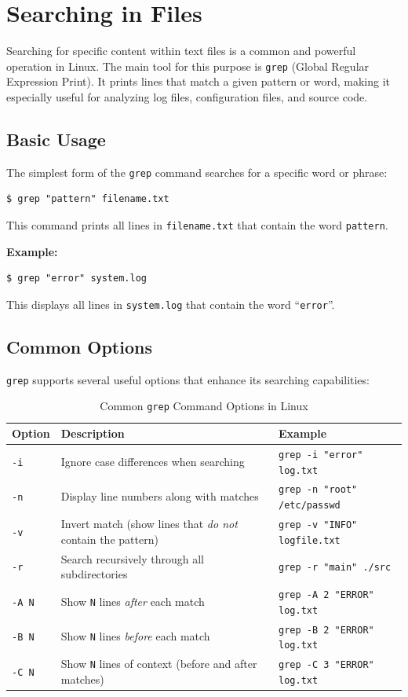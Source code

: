 \section{Searching in Files}
Searching for specific content within text files is a common and powerful operation in Linux. The main tool for this purpose is \texttt{grep} (Global Regular Expression Print). It prints lines that match a given pattern or word, making it especially useful for analyzing log files, configuration files, and source code.

\subsection{Basic Usage}
The simplest form of the \texttt{grep} command searches for a specific word or phrase:
\begin{lstlisting}[language=Terminal]
$ grep "pattern" filename.txt
\end{lstlisting}
This command prints all lines in \texttt{filename.txt} that contain the word \texttt{pattern}.

\textbf{Example:}
\begin{lstlisting}[language=Terminal]
$ grep "error" system.log
\end{lstlisting}
This displays all lines in \texttt{system.log} that contain the word ``\texttt{error}''.

\subsection{Common Options}
\texttt{grep} supports several useful options that enhance its searching capabilities:
\begin{table}[h!]
\centering
\small
\renewcommand{\arraystretch}{1.3}
\begin{tabular}{|>{\centering\arraybackslash}p{2cm}|>{\raggedright\arraybackslash}p{6cm}|>{\raggedright\arraybackslash}p{6cm}|}
\hline
\textbf{Option} & \textbf{Description} & \textbf{Example} \\ \hline
\texttt{-i} & Ignore case differences when searching & \texttt{grep -i "error" log.txt} \\ \hline
\texttt{-n} & Display line numbers along with matches & \texttt{grep -n "root" /etc/passwd} \\ \hline
\texttt{-v} & Invert match (show lines that \emph{do not} contain the pattern) & \texttt{grep -v "INFO" logfile.txt} \\ \hline
\texttt{-r} & Search recursively through all subdirectories & \texttt{grep -r "main" ./src} \\ \hline
\texttt{-A N} & Show \texttt{N} lines \emph{after} each match & \texttt{grep -A 2 "ERROR" log.txt} \\ \hline
\texttt{-B N} & Show \texttt{N} lines \emph{before} each match & \texttt{grep -B 2 "ERROR" log.txt} \\ \hline
\texttt{-C N} & Show \texttt{N} lines of context (before and after matches) & \texttt{grep -C 3 "ERROR" log.txt} \\ \hline
\end{tabular}
\caption{Common \texttt{grep} Command Options in Linux}
\label{tab:grep-options}
\end{table}

